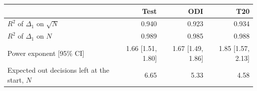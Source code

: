 \begin{tabular}{lrrr}
\toprule
 & Test & ODI & T20 \\
\midrule
$R^2$ of $\Delta_1$ on $\sqrt N$ & 0.940 & 0.923 & 0.934 \\
$R^2$ of $\Delta_1$ on $N$ & 0.989 & 0.985 & 0.988 \\
Power exponent [95\% CI] & 1.66 [1.51, 1.80] & 1.67 [1.49, 1.86] & 1.85 [1.57, 2.13] \\
Expected out decisions left at the start, $N$ & 6.65 & 5.33 & 4.58 \\
\bottomrule
\end{tabular}
